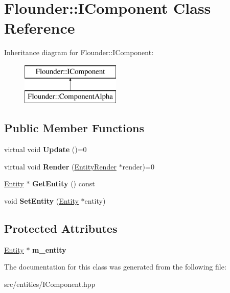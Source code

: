\hypertarget{class_flounder_1_1_i_component}{}\section{Flounder\+:\+:I\+Component Class Reference}
\label{class_flounder_1_1_i_component}
Inheritance diagram for Flounder\+:\+:I\+Component\+:\begin{figure}[H]
\begin{center}
\leavevmode
\includegraphics[height=2.000000cm]{class_flounder_1_1_i_component}
\end{center}
\end{figure}
\subsection*{Public Member Functions}
\begin{DoxyCompactItemize}
\item 
\mbox{\label{class_flounder_1_1_i_component_ae73786a9312482138de429427375e314}} 
virtual void {\bfseries Update} ()=0
\item 
\mbox{\label{class_flounder_1_1_i_component_a8fe24d216bb32e11d451aaeec31da047}} 
virtual void {\bfseries Render} (\hyperlink{struct_flounder_1_1_entity_render}{Entity\+Render} $\ast$render)=0
\item 
\mbox{\label{class_flounder_1_1_i_component_a4add89e9bedb08a5f3855100e3b8c95f}} 
\hyperlink{class_flounder_1_1_entity}{Entity} $\ast$ {\bfseries Get\+Entity} () const
\item 
\mbox{\label{class_flounder_1_1_i_component_aed16cdf202d0387bff60c0b8ffe56d4f}} 
void {\bfseries Set\+Entity} (\hyperlink{class_flounder_1_1_entity}{Entity} $\ast$entity)
\end{DoxyCompactItemize}
\subsection*{Protected Attributes}
\begin{DoxyCompactItemize}
\item 
\mbox{\label{class_flounder_1_1_i_component_ae85ac656e5eda471a465f830c272eebd}} 
\hyperlink{class_flounder_1_1_entity}{Entity} $\ast$ {\bfseries m\+\_\+entity}
\end{DoxyCompactItemize}


The documentation for this class was generated from the following file\+:\begin{DoxyCompactItemize}
\item 
src/entities/I\+Component.\+hpp\end{DoxyCompactItemize}
